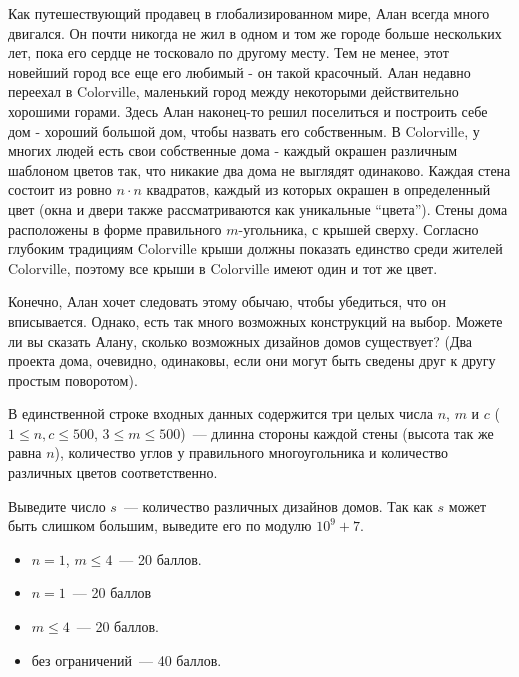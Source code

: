 
\Legend
Как путешествующий продавец в глобализированном мире, Алан всегда много двигался. Он почти никогда
не жил в одном и том же городе больше нескольких лет, пока его сердце не тосковало по другому месту.
Тем не менее, этот новейший город все еще его любимый - он такой красочный. Алан недавно переехал
в Colorville, маленький город между некоторыми действительно хорошими горами. Здесь Алан наконец-то
решил поселиться и построить себе дом - хороший большой дом, чтобы назвать его собственным.
В Colorville, у многих людей есть свои собственные дома - каждый окрашен различным шаблоном цветов
так, что никакие два дома не выглядят одинаково. Каждая стена состоит из ровно $n \cdot n$ квадратов,
каждый из которых окрашен в определенный цвет (окна и двери также рассматриваются как уникальные
``цвета''). Стены дома расположены в форме правильного $m$-угольника, с крышей сверху. Согласно
глубоким традициям Colorville крыши должны показать единство среди жителей Colorville, поэтому все
крыши в Colorville имеют один и тот же цвет.

Конечно, Алан хочет следовать этому обычаю, чтобы убедиться, что он вписывается. Однако, есть
так много возможных конструкций на выбор. Можете ли вы сказать Алану, сколько возможных дизайнов
домов существует? (Два проекта дома, очевидно, одинаковы, если они могут быть сведены друг к другу
простым поворотом).

\Input
В единственной строке входных данных содержится три целых числа $n$, $m$ и $c$ ($1 \le n, c \le 500$,
$3 \le m \le 500$)~--- длинна стороны каждой стены (высота так же равна $n$), количество углов у
правильного многоугольника и количество различных цветов соответственно.

\Output
Выведите число $s$~--- количество различных дизайнов домов. Так как $s$ может быть слишком большим,
выведите его по модулю $10^9 + 7$.

\Samples
\BeginTests
{}
\EndTests

\Scoring
\begin{itemize}
	\item $n = 1$, $m \le 4$~--- 20 баллов.
	\item $n = 1$~--- 20 баллов
	\item $m \le 4$~--- 20 баллов.
	\item без ограничений~--- 40 баллов.
\end{itemize}

\EndProblem
